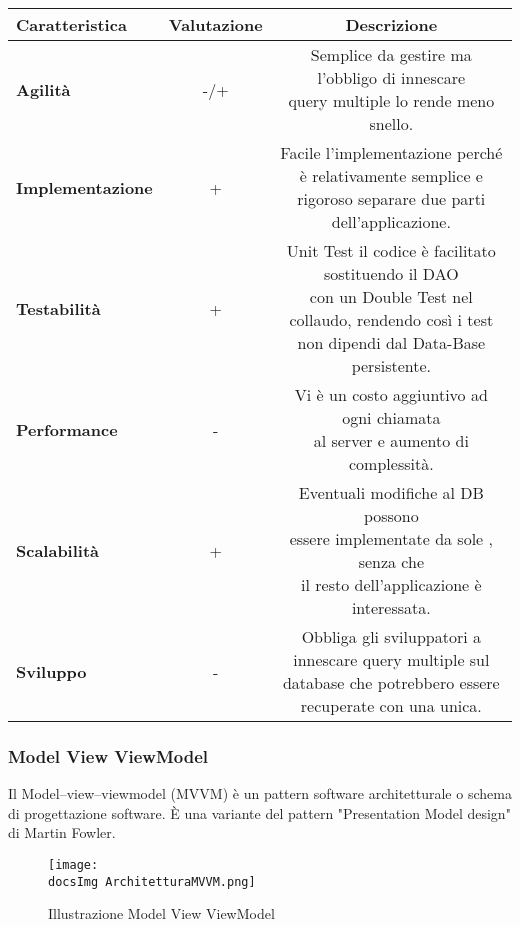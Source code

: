 {{{\begin{itemize}
				\small %
				{\renewcommand\arraystretch{1.2} %
					\begin{tabular}{|l|c|c|}
						\hline
						{\textbf{Caratteristica}}&{\textbf{Valutazione}}&{\textbf{Descrizione}}\\
						\hline
						\textbf{Agilità} & -/+ &  \minitab[c]{Semplice da gestire ma l'obbligo di innescare\\ query multiple lo rende meno snello.} \\
						\hline
						\textbf{Implementazione} & + &  \minitab[c]{Facile l'implementazione perché è relativamente semplice e\\ rigoroso separare due parti dell'applicazione.} \\
						\hline
						\textbf{Testabilità} & + & \minitab[c]{Unit Test il codice è facilitato sostituendo il DAO\\ con un Double Test nel collaudo, rendendo così i test\\ non dipendi dal Data-Base persistente.} \\
						\hline
						\textbf{Performance} & - &  \minitab[c]{Vi è un costo aggiuntivo ad ogni chiamata\\ al server e aumento di complessità.} \\
						\hline
						\textbf{Scalabilità} & + &  \minitab[c]{Eventuali modifiche al DB possono\\ essere implementate da sole , senza che\\ il resto dell'applicazione è interessata.} \\
						\hline
						\textbf{Sviluppo} & - &  \minitab[c]{Obbliga gli sviluppatori a innescare query multiple sul\\ database che potrebbero essere recuperate con una unica.} \\
						\hline
					\end{tabular}
				}
			\end{itemize}
		}
	
		\subsubsection{Model View ViewModel}{
			Il Model–view–viewmodel (MVVM) è un pattern software architetturale o schema di progettazione software. È una variante del pattern "Presentation Model design" di Martin Fowler.
			
			\begin{figure}[h]
				\centering
				\texttt{[image: \\docsImg ArchitetturaMVVM.png]}
				\caption{Illustrazione Model View ViewModel}
				\label{Illustrazione Model View ViewModel}
			\end{figure}
			
}}}

